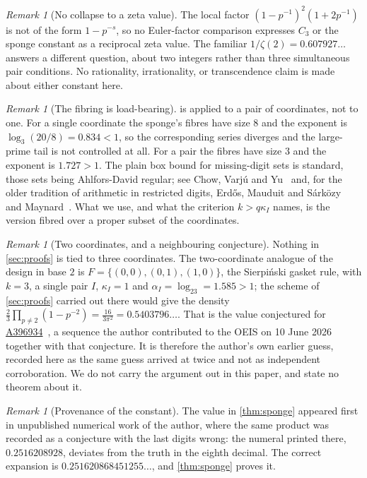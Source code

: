 \documentclass[11pt]{amsart}
\theoremstyle{definition}
\theoremstyle{remark}
\newtheorem{remark}[theorem]{Remark}
\begin{document}
\begin{remark}[No collapse to a zeta value]
\label{rem:zeta}
The local factor $(1-p^{-1})^2(1+2p^{-1})$ is not of the form $1-p^{-s}$, so no Euler-factor comparison expresses $C_3$ or the sponge constant as a reciprocal zeta value. The familiar $1/\zeta(2)=0.607927\ldots$ answers a different question, about two integers rather than three simultaneous pair conditions. No rationality, irrationality, or transcendence claim is made about either constant here.
\end{remark}

\begin{remark}[The fibring is load-bearing]
\label{rem:fibre}
 is applied to a pair of coordinates, not to one. For a single coordinate the sponge's fibres have size $8$ and the exponent is $\log_3(20/8)=0.834<1$, so the corresponding series diverges and the large-prime tail is not controlled at all. For a pair the fibres have size $3$ and the exponent is $1.727>1$. The plain box bound for missing-digit sets is standard, those sets being Ahlfors-David regular; see Chow, Varj\'u and Yu~\cite{cvy} and, for the older tradition of arithmetic in restricted digits, Erd\H os, Mauduit and S\'ark\"ozy~\cite{ems} and Maynard~\cite{maynard}. What we use, and what the criterion $k>q\kappa_I$ names, is the version fibred over a proper subset of the coordinates.
\end{remark}

\begin{remark}[Two coordinates, and a neighbouring conjecture]
\label{rem:gasket}
Nothing in \cref{sec:proofs} is tied to three coordinates. The two-coordinate analogue of the design in base $2$ is $F=\{(0,0),(0,1),(1,0)\}$, the Sierpi\'nski gasket rule, with $k=3$, a single pair $I$, $\kappa_I=1$ and $\alpha_I=\log_23=1.585>1$; the scheme of \cref{sec:proofs} carried out there would give the density $\frac23\prod_{p\ne2}(1-p^{-2})=\frac{16}{3\pi^2}=0.5403796\ldots$. That is the value conjectured for \href{https://oeis.org/A396934}{A396934}~\cite{oeisA396934}, a sequence the author contributed to the OEIS on 10 June 2026 together with that conjecture. It is therefore the author's own earlier guess, recorded here as the same guess arrived at twice and not as independent corroboration. We do not carry the argument out in this paper, and state no theorem about it.
\end{remark}

\begin{remark}[Provenance of the constant]
\label{rem:prov}
The value in \cref{thm:sponge} appeared first in unpublished numerical work of the author, where the same product was recorded as a conjecture with the last digits wrong: the numeral printed there, $0.2516208928$, deviates from the truth in the eighth decimal. The correct expansion is $0.251620868451255\ldots$, and \cref{thm:sponge} proves it.
\end{remark}
\end{document}
